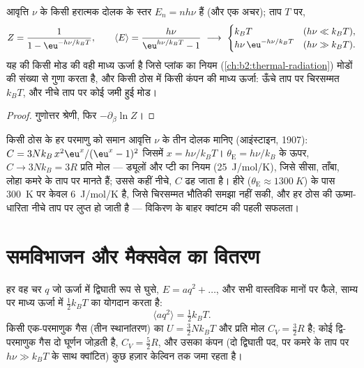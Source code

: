 \begin{proposition}[क्वांटम दोलक और प्लांक का सूत्र]\label{prop:b2:boltzmann-factor:oscillator}
आवृत्ति $\nu$ के किसी हरात्मक दोलक के स्तर $E_n = nh\nu$ हैं (और एक
अचर); ताप $T$ पर,
\[
Z = \frac{1}{1 - \eu^{-h\nu/k_BT}}, \qquad
\langle E\rangle = \frac{h\nu}{\eu^{h\nu/k_BT} - 1}
\ \longrightarrow\
\begin{cases} k_BT & (h\nu \ll k_BT), \\ h\nu\,\eu^{-h\nu/k_BT} & (h\nu \gg k_BT). \end{cases}
\]
यह  की किसी मोड की वही माध्य ऊर्जा है जिसे प्लांक का
नियम (\cref{ch:b2:thermal-radiation}) मोडों की संख्या से गुणा करता है,
और किसी ठोस में किसी कंपन की माध्य ऊर्जा: ऊँचे ताप पर
चिरसम्मत $k_BT$, और नीचे ताप पर कोई जमी हुई मोड।
\end{proposition}

\begin{proof}
गुणोत्तर श्रेणी, फिर $-\partial_\beta\ln Z$।
\end{proof}

\begin{example}[ठोसों की ऊष्मा-धारिता]\label{ex:b2:boltzmann-factor:einstein}
किसी ठोस के हर परमाणु को समान आवृत्ति $\nu$ के तीन दोलक मानिए
(आइंस्टाइन, 1907): $C = 3Nk_B\,x^2\eu^x/(\eu^x - 1)^2$ जिसमें $x =
h\nu/k_BT$। $\theta_{\text{E}} = h\nu/k_B$ के ऊपर, $C \to 3Nk_B = 3R$ प्रति मोल
--- ड्यूलों और प्टी का नियम (\qty{25}{J/mol/K}), जिसे सीसा,
ताँबा, लोहा कमरे के ताप पर मानते हैं; उससे कहीं नीचे, $C$ ढह जाता है। हीरे
($\theta_{\text{E}} \approx \qty{1300}{K}$) के पास \qty{300}{K} पर केवल \qty{6}{J/mol/K}
है, जिसे चिरसम्मत भौतिकी समझा नहीं सकी, और हर ठोस की
ऊष्मा-धारिता नीचे ताप पर लुप्त हो जाती है --- विकिरण के बाहर क्वांटम की पहली सफलता।
\end{example}

\section{समविभाजन और मैक्सवेल का वितरण}

\begin{theorem}[ऊर्जा का समविभाजन]\label{thm:b2:boltzmann-factor:equipartition}
हर वह चर $q$ जो ऊर्जा में द्विघाती रूप से घुसे, $E = aq^2 +
\dots$, और सभी वास्तविक मानों पर फैले, साम्य पर माध्य ऊर्जा में
$\tfrac12k_BT$ का योगदान करता है:
\[
\langle aq^2\rangle = \tfrac12k_BT .
\]
किसी एक-परमाणुक गैस (तीन स्थानांतरण) का $U = \tfrac32Nk_BT$ और प्रति मोल $C_V =
\tfrac32R$ है; कोई द्वि-परमाणुक गैस दो घूर्णन जोड़ती है, $C_V = \tfrac52R$,
और उसका कंपन (दो द्विघाती पद, पर कमरे के ताप पर $h\nu \gg
k_BT$ के साथ क्वांटित) कुछ हज़ार केल्विन तक जमा रहता है।
\end{theorem}

